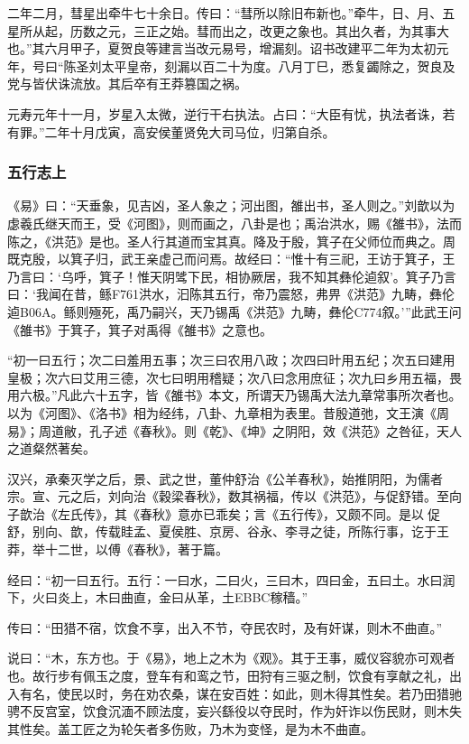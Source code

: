 \documentclass[]{article}
\begin{document}
二年二月，彗星出牵牛七十余日。传曰：``彗所以除旧布新也。''牵牛，日、月、五星所从起，历数之元，三正之始。彗而出之，改更之象也。其出久者，为其事大也。''其六月甲子，夏贺良等建言当改元易号，增漏刻。诏书改建平二年为太初元年，号曰``陈圣刘太平皇帝，刻漏以百二十为度。八月丁巳，悉复蠲除之，贺良及党与皆伏诛流放。其后卒有王莽篡国之祸。

元寿元年十一月，岁星入太微，逆行干右执法。占曰：``大臣有忧，执法者诛，若有罪。''二年十月戊寅，高安侯董贤免大司马位，归第自杀。

\hypertarget{header-n1987}{%
\subsubsection{五行志上}\label{header-n1987}}

《易》曰：``天垂象，见吉凶，圣人象之；河出图，雒出书，圣人则之。''刘歆以为虙羲氏继天而王，受《河图》，则而画之，八卦是也；禹治洪水，赐《雒书》，法而陈之，《洪范》是也。圣人行其道而宝其真。降及于殷，箕子在父师位而典之。周既克殷，以箕子归，武王亲虚己而问焉。故经曰：``惟十有三祀，王访于箕子，王乃言曰：`乌呼，箕子！惟天阴骘下民，相协厥居，我不知其彝伦逌叙'。箕子乃言曰：`我闻在昔，鲧F761洪水，汩陈其五行，帝乃震怒，弗畀《洪范》九畴，彝伦逌B06A。鲧则殛死，禹乃嗣兴，天乃锡禹《洪范》九畴，彝伦C774叙。'''此武王问《雒书》于箕子，箕子对禹得《雒书》之意也。

``初一曰五行；次二曰羞用五事；次三曰农用八政；次四曰旪用五纪；次五曰建用皇极；次六曰艾用三德，次七曰明用稽疑；次八曰念用庶征；次九曰乡用五福，畏用六极。''凡此六十五字，皆《雒书》本文，所谓天乃锡禹大法九章常事所次者也。以为《河图》、《洛书》相为经纬，八卦、九章相为表里。昔殷道弛，文王演《周易》；周道敝，孔子述《春秋》。则《乾》、《坤》之阴阳，效《洪范》之咎征，天人之道粲然著矣。

汉兴，承秦灭学之后，景、武之世，董仲舒治《公羊春秋》，始推阴阳，为儒者宗。宣、元之后，刘向治《穀梁春秋》，数其祸福，传以《洪范》，与促舒错。至向子歆治《左氏传》，其《春秋》意亦已乖矣；言《五行传》，又颇不同。是以促舒，别向、歆，传载眭孟、夏侯胜、京房、谷永、李寻之徒，所陈行事，讫于王莽，举十二世，以傅《春秋》，著于篇。

经曰：``初一曰五行。五行：一曰水，二曰火，三曰木，四曰金，五曰土。水曰润下，火曰炎上，木曰曲直，金曰从革，土EBBC稼穑。''

传曰：``田猎不宿，饮食不享，出入不节，夺民农时，及有奸谋，则木不曲直。''

说曰：``木，东方也。于《易》，地上之木为《观》。其于王事，威仪容貌亦可观者也。故行步有佩玉之度，登车有和鸾之节，田狩有三驱之制，饮食有享献之礼，出入有名，使民以时，务在劝农桑，谋在安百姓：如此，则木得其性矣。若乃田猎驰骋不反宫室，饮食沉湎不顾法度，妄兴繇役以夺民时，作为奸诈以伤民财，则木失其性矣。盖工匠之为轮矢者多伤败，乃木为变怪，是为木不曲直。
\end{document}
